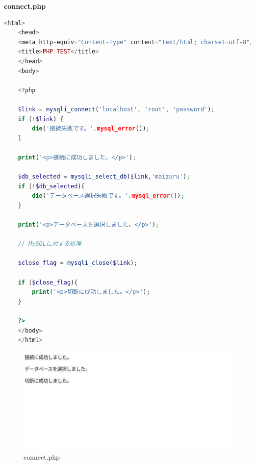 \textbf{connect.php}
\begin{lstlisting}[language=php]
    <html>
    <head>
    <meta http-equiv="Content-Type" content="text/html; charset=utf-8"/>
    <title>PHP TEST</title>
    </head>
    <body>
    
    <?php
    
    $link = mysqli_connect('localhost', 'root', 'password');
    if (!$link) {
        die('接続失敗です。'.mysql_error());
    }
    
    print('<p>接続に成功しました。</p>');
    
    $db_selected = mysqli_select_db($link,'maizuru');
    if (!$db_selected){
        die('データベース選択失敗です。'.mysql_error());
    }
    
    print('<p>データベースを選択しました。</p>');
    
    // MySQLに対する処理
    
    $close_flag = mysqli_close($link);
    
    if ($close_flag){
        print('<p>切断に成功しました。</p>');
    }
    
    ?>
    </body>
    </html>
\end{lstlisting}

\begin{figure}[htbp]
  \centering
  \includegraphics[width=0.9\linewidth]{figure/6.pdf}
  \caption{connect.php}
\end{figure}

